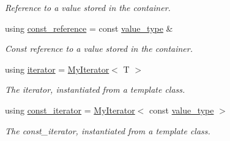 \begin{DoxyCompactItemize}
\begin{DoxyCompactList}\small\item\em Reference to a value stored in the container. \end{DoxyCompactList}\item 
\mbox{\label{classsc_1_1vector_a8da2b1a11b069241100f9b2e14f481a0}} 
using \hyperlink{classsc_1_1vector_a8da2b1a11b069241100f9b2e14f481a0}{const\+\_\+reference} = const \hyperlink{classsc_1_1vector_ad37f5bfa688e43c420ed565e4bff6fac}{value\+\_\+type} \&
\begin{DoxyCompactList}\small\item\em Const reference to a value stored in the container. \end{DoxyCompactList}\item 
\mbox{\label{classsc_1_1vector_a9e5d5cc35e379aa27a93989f4a71413c}} 
using \hyperlink{classsc_1_1vector_a9e5d5cc35e379aa27a93989f4a71413c}{iterator} = \hyperlink{classsc_1_1MyIterator}{My\+Iterator}$<$ T $>$
\begin{DoxyCompactList}\small\item\em The iterator, instantiated from a template class. \end{DoxyCompactList}\item 
\mbox{\label{classsc_1_1vector_a1e50aa429ea9de6ead4bfdb8614c1c9a}} 
using \hyperlink{classsc_1_1vector_a1e50aa429ea9de6ead4bfdb8614c1c9a}{const\+\_\+iterator} = \hyperlink{classsc_1_1MyIterator}{My\+Iterator}$<$ const \hyperlink{classsc_1_1vector_ad37f5bfa688e43c420ed565e4bff6fac}{value\+\_\+type} $>$
\begin{DoxyCompactList}\small\item\em The const\+\_\+iterator, instantiated from a template class. \end{DoxyCompactList}\end{DoxyCompactItemize}
